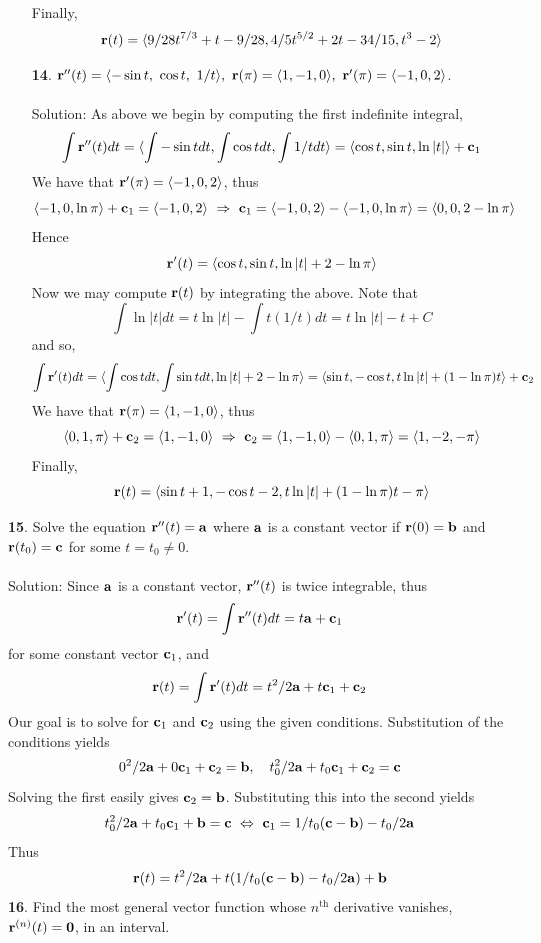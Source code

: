 \documentclass[12pt]{amsbook}
\newcommand{\la}{\langle}
\newcommand{\ra}{\rangle}
\begin{document}
\begin{enumerate}
  Finally,
  $${\bf r}(t)=\la 9/28t^{7/3}+t-9/28,4/5t^{5/2}+2t-34/15,t^3-2 \ra$$
  \item[{\small\bf 14}.] ${\bf r}''(t)=\la -\sin t,\ \cos t,\ 1/t \ra, \ {\bf r}(\pi)=\la 1,-1,0 \ra, \ {\bf r}'(\pi)=\la -1,0,2 \ra$.
  \\
  \\
  {\sc Solution}: As above we begin by computing the first indefinite integral,
  $$\int {\bf r}''(t)dt=\la \int -\sin t dt, \int \cos tdt, \int 1/t dt\ra = \la \cos t,\sin t,\ln|t| \ra +{\bf c}_1$$
  We have that ${\bf r}'(\pi)=\la -1,0,2 \ra$, thus
  $$\la -1,0,\ln \pi \ra + {\bf c}_1= \la -1,0,2 \ra \ \Rightarrow \ {\bf c}_1=\la -1,0,2 \ra- \la -1,0,\ln \pi \ra = \la 0,0,2-\ln \pi \ra $$
  Hence
  $${\bf r}'(t)=\la \cos t,\sin t,\ln|t|+2-\ln \pi \ra$$
  Now we may compute ${\bf r}(t)$ by integrating the above. Note that
  $$\int \ln|t|dt = t\ln|t|-\int t(1/t)dt = t\ln|t|-t+C$$
  and so,
  $$\int {\bf r}'(t)dt= \la \int \cos tdt, \int \sin t dt, \ln|t|+2-\ln \pi \ra = \la \sin t,-\cos t,t\ln|t|+(1-\ln \pi)t \ra + {\bf c}_2$$
  We have that ${\bf r}(\pi)=\la 1,-1,0 \ra$, thus
  $$\la 0,1,\pi \ra + {\bf c}_2= \la 1,-1,0 \ra \ \Rightarrow \ {\bf c}_2=\la 1,-1,0 \ra - \la 0,1,\pi\ra = \la 1, -2 , -\pi \ra$$
  Finally,
  $${\bf r}(t)=\la \sin t +1,-\cos t-2,t\ln|t|+(1-\ln \pi)t -\pi \ra$$
\end{enumerate}
{\small\bf 15}. Solve the equation ${\bf r}''(t) = {\bf a}$ where ${\bf a}$ is a constant vector if ${\bf r}(0) = {\bf b}$ and ${\bf r}(t_0) = {\bf c}$ for some $t=t_0\neq 0$. 
\\
\\
{\sc Solution}: Since ${\bf a}$ is a constant vector, ${\bf r}''(t)$ is twice integrable, thus
$${\bf r}'(t)=\int {\bf r}''(t)dt=t{\bf a}+{\bf c}_1$$
for some constant vector ${\bf c}_1$, and 
$${\bf r}(t)=\int {\bf r}'(t)dt=t^2/2{\bf a}+t{\bf c}_1+{\bf c}_2$$
Our goal is to solve for ${\bf c}_1$ and ${\bf c}_2$ using the given conditions. Substitution of the conditions yields
$$0^2/2{\bf a}+0{\bf c}_1+{\bf c}_2={\bf b}, \ \ \ t_0^2/2{\bf a}+t_0{\bf c}_1+{\bf c}_2={\bf c}$$
Solving the first easily gives ${\bf c}_2={\bf b}$. Substituting this into the second yields
$$t_0^2/2{\bf a}+t_0{\bf c}_1+{\bf b}={\bf c} \ \Leftrightarrow \ {\bf c}_1=1/t_0({\bf c}-{\bf b})-t_0/2{\bf a}$$
Thus
$${\bf r}(t)=t^2/2{\bf a}+t(1/t_0({\bf c}-{\bf b})-t_0/2{\bf a})+{\bf b}$$
{\small\bf 16}. Find the most general vector function whose $n^{\text{th}}$ derivative vanishes,
${\bf r}^{(n)}(t)={\bf 0}$, in an interval. 
\\
\end{document}
